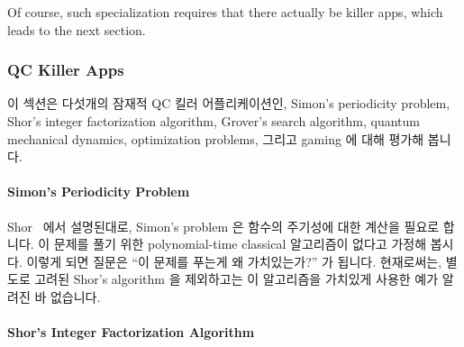 Of course, such specialization requires that there actually be killer
apps, which leads to the next section.
\fi

\subsubsection{QC Killer Apps}
\label{sec:future:QC Killer Apps}

이 섹션은 다섯개의 잠재적 QC 킬러 어플리케이션인,
Simon's periodicity problem,
Shor's integer factorization algorithm,
Grover's search algorithm,
quantum mechanical dynamics,
optimization problems, 그리고
gaming 에 대해 평가해 봅니다.

\paragraph{Simon's Periodicity Problem}
\label{sec:future:Simon's Periodicity Problem}

Shor~\cite{PeterWSchor2001QuantumAlgorithms} 에서 설명된대로, Simon's problem
은 함수의 주기성에 대한 계산을 필요로 합니다.
이 문제를 풀기 위한 polynomial-time classical 알고리즘이 없다고 가정해 봅시다.
이렇게 되면 질문은 ``이 문제를 푸는게 왜 가치있는가?'' 가 됩니다.
현재로써는, 별도로 고려된 Shor's algorithm 을 제외하고는 이 알고리즘을 가치있게
사용한 예가 알려진 바 없습니다.

\paragraph{Shor's Integer Factorization Algorithm}
\label{sec:future:Shor's Integer Factorization Algorithm}

